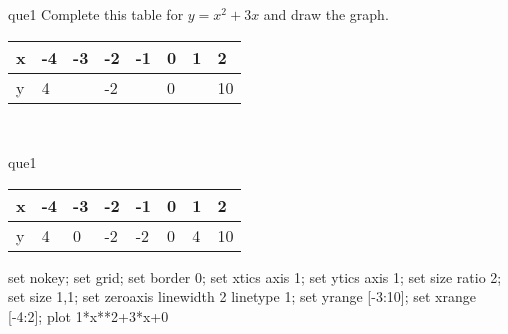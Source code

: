 \documentclass[13.5pt, varwidth=true]{beamer}
\begin{document}
\begin{frame}[shrink=19,fragile]
	\begin{beamercolorbox}[rounded=true, left, shadow=true,wd=14.8cm]{que1}
		 Complete this table for $y = x^{2} + 3x$ and draw the graph. \\[0.3cm] \renewcommand{\arraystretch}{1.2}\begin{tabular}{|C|C|C|C|C|C|C|C|} \hline x & -4 & -3 & -2 & -1 & 0 & 1 & 2 \\ \hline y & 4 &  & -2 &  & 0 &  & 10\\ \hline \end{tabular}\\[0.3cm]
	\end{beamercolorbox}
\end{frame}
\begin{frame}[shrink=19,fragile]
	\begin{beamercolorbox}[rounded=true, left, shadow=true,wd=14.8cm]{que1}
		\renewcommand{\arraystretch}{1.2}\begin{tabular}{|C|C|C|C|C|C|C|C|} \hline x & -4 & -3 & -2 & -1 & 0 & 1 & 2 \\ \hline y & 4 & 0 & -2 & -2 & 0 & 4 & 10\\ \hline \end{tabular}\begin{gnuplot}[terminal=pdf] set nokey; set grid; set border 0; set xtics axis 1; set ytics axis 1; set size ratio 2; set size 1,1; set zeroaxis linewidth 2 linetype 1; set yrange [-3:10]; set xrange [-4:2]; plot 1*x**2+3*x+0 \end{gnuplot}
	\end{beamercolorbox}
\end{frame}
\end{document}
